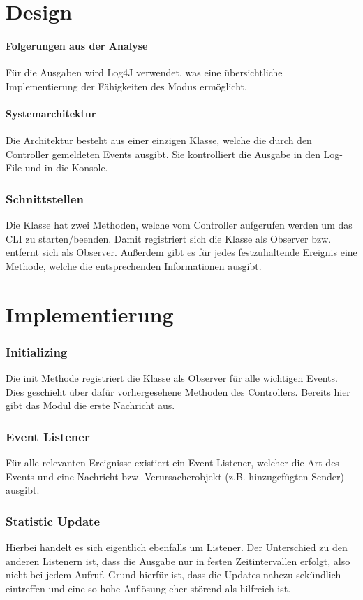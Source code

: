 \chapter{Design}

\subsubsection{Folgerungen aus der Analyse}
Für die Ausgaben wird Log4J verwendet, was eine übersichtliche Implementierung
der Fähigkeiten des Modus ermöglicht.

\subsubsection{Systemarchitektur}
Die Architektur besteht aus einer einzigen Klasse, welche die durch den
Controller gemeldeten Events ausgibt. Sie kontrolliert die Ausgabe in den
Log-File und in die Konsole.

\subsection{Schnittstellen}
Die Klasse hat zwei Methoden, welche
vom Controller aufgerufen werden um das CLI zu starten/beenden. Damit
registriert sich die Klasse als Observer bzw. entfernt sich als Observer.
Außerdem gibt es für jedes festzuhaltende Ereignis eine Methode, welche die
entsprechenden Informationen ausgibt.

\chapter{Implementierung}

\subsection{Initializing}
Die init Methode registriert die Klasse als Observer für alle wichtigen Events.
Dies geschieht über dafür vorhergesehene Methoden des Controllers. Bereits hier
gibt das Modul die erste Nachricht aus.

\subsection{Event Listener}
Für alle relevanten Ereignisse existiert ein Event Listener, welcher die Art des
Events und eine Nachricht bzw. Verursacherobjekt (z.B. hinzugefügten Sender)
ausgibt.

\subsection{Statistic Update}
Hierbei handelt es sich eigentlich ebenfalls um Listener. Der Unterschied zu den
anderen Listenern ist, dass die Ausgabe nur in festen Zeitintervallen erfolgt,
also nicht bei jedem Aufruf. Grund hierfür ist, dass die Updates nahezu
sekündlich eintreffen und eine so hohe Auflösung eher störend als hilfreich ist.


